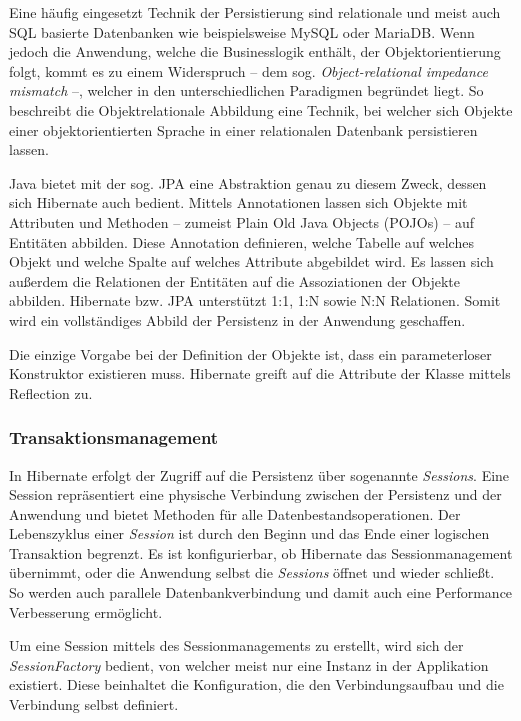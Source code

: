 				Eine häufig eingesetzt Technik der Persistierung sind relationale und meist auch \acs{SQL} \cite{Chamberlin.1974} basierte Datenbanken wie beispielsweise MySQL oder MariaDB. Wenn jedoch die Anwendung, welche die Businesslogik enthält, der Objektorientierung folgt, kommt es zu einem Widerspruch -- dem sog. \textit{Object-relational impedance mismatch} --, welcher in den unterschiedlichen Paradigmen begründet liegt. So beschreibt die Objektrelationale Abbildung eine Technik, bei welcher sich Objekte einer objektorientierten Sprache in einer relationalen Datenbank persistieren lassen. \cite{Ireland.2009}
					
				Java bietet mit der sog. \ac{JPA} \cite{BerndMuller.2012} eine Abstraktion genau zu diesem Zweck, dessen sich Hibernate auch bedient. Mittels Annotationen lassen sich Objekte mit Attributen und Methoden -- zumeist Plain Old Java Objects (\acs{POJO}s) -- auf Entitäten abbilden. Diese Annotation definieren, welche Tabelle auf welches Objekt und welche Spalte auf welches Attribute abgebildet wird. Es lassen sich außerdem die Relationen der Entitäten auf die Assoziationen der Objekte abbilden. Hibernate bzw. \acs{JPA} unterstützt 1:1, 1:N sowie N:N Relationen. Somit wird ein vollständiges Abbild der Persistenz in der Anwendung geschaffen.
				
				Die einzige Vorgabe bei der Definition der Objekte ist, dass ein parameterloser Konstruktor existieren muss. Hibernate greift auf die Attribute der Klasse mittels Reflection zu. 
				
			\subsubsection{Transaktionsmanagement} %
			
				In Hibernate erfolgt der Zugriff auf die Persistenz über sogenannte \textit{Sessions}. Eine Session repräsentiert eine physische Verbindung zwischen der Persistenz und der Anwendung und bietet Methoden für alle Datenbestandsoperationen. Der Lebenszyklus einer \textit{Session} ist durch den Beginn und das Ende einer logischen Transaktion begrenzt. Es ist konfigurierbar, ob Hibernate das Sessionmanagement übernimmt, oder die Anwendung selbst die \textit{Sessions} öffnet und wieder schließt. So werden auch parallele Datenbankverbindung und damit auch eine Performance Verbesserung ermöglicht.
				
				Um eine Session mittels des Sessionmanagements zu erstellt, wird sich der \textit{SessionFactory} bedient, von welcher meist nur eine Instanz in der Applikation existiert. Diese beinhaltet die Konfiguration, die den Verbindungsaufbau und die Verbindung selbst definiert.
				
